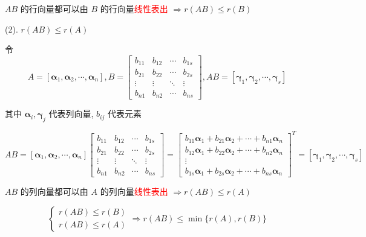 \begin{anymark}[证明]
	$AB$ 的行向量都可以由 $B$ 的行向量\textcolor{red}{线性表出} $\Rightarrow r(AB)\leq r(B)$

	(2). $r(AB) \leq r(A)$

	令
	$$A = [\boldsymbol{\alpha}_{1},\boldsymbol{\alpha}_{2},\cdots,\boldsymbol{\alpha}_{n}],
	B = \begin{bmatrix}
		b_{11} & b_{12} & \cdots & b_{1s}\\
		b_{21} & b_{22} & \cdots & b_{2s}\\
		\vdots & \vdots & \ddots & \vdots\\
		b_{n1} & b_{n2} & \cdots & b_{ns}
	\end{bmatrix},
	AB = [\boldsymbol{\gamma}_{1}, \boldsymbol{\gamma}_{2}, \cdots, \boldsymbol{\gamma}_{s}]$$

	其中 $\boldsymbol{\alpha}_{i}, \boldsymbol{\gamma}_{j}$ 代表列向量, $b_{ij}$ 代表元素

	$$AB = [\boldsymbol{\alpha}_{1},\boldsymbol{\alpha}_{2},\cdots,\boldsymbol{\alpha}_{n}]
	\begin{bmatrix}
		b_{11} & b_{12} & \cdots & b_{1s}\\
		b_{21} & b_{22} & \cdots & b_{2s}\\
		\vdots & \vdots & \ddots & \vdots\\
		b_{n1} & b_{n2} & \cdots & b_{ns}
	\end{bmatrix} =
	\begin{bmatrix}
		b_{11}\boldsymbol{\alpha}_{1}+b_{21}\boldsymbol{\alpha}_{2}+\cdots+b_{n1}\boldsymbol{\alpha}_{n}\\
		b_{12}\boldsymbol{\alpha}_{1}+b_{22}\boldsymbol{\alpha}_{2}+\cdots+b_{n2}\boldsymbol{\alpha}_{n}\\
		\vdots\\
		b_{1s}\boldsymbol{\alpha}_{1}+b_{2s}\boldsymbol{\alpha}_{2}+\cdots+b_{ns}\boldsymbol{\alpha}_{n}
	\end{bmatrix}^{T} =
	[\boldsymbol{\gamma}_{1}, \boldsymbol{\gamma}_{2}, \cdots, \boldsymbol{\gamma}_{s}]$$

	$AB$ 的列向量都可以由 $A$ 的列向量\textcolor{red}{线性表出} $\Rightarrow r(AB)\leq r(A)$

	$$\begin{cases}
		r(AB)\leq r(B)\\
		r(AB)\leq r(A)
	\end{cases}\Rightarrow r(AB) \leq \min\{r(A),r(B)\}$$
\end{anymark}

